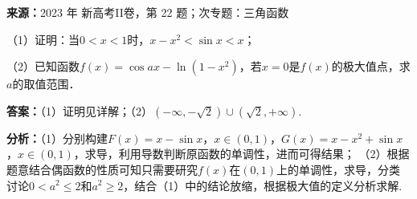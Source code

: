 \begin{question}[points=10]
\textbf{来源：}2023 年 新高考II卷，第 22 题；次专题：三角函数\par
（1）证明：当$0<x<1$时，$x-x^{2}<\sin x<x$；

（2）已知函数$f(x)=\cos ax-\ln(1-x^{2})$，若$x=0$是$f(x)$的极大值点，求$a$的取值范围．
\begin{solution}
\textbf{答案：}（1）证明见详解；（2）$(-\infty,-\sqrt{2})\cup(\sqrt{2},+\infty)$.

\textbf{分析：}（1）分别构建$F(x)=x-\sin x$，$x\in(0,1)$，$G(x)=x-x^{2}+\sin x$，$x\in(0,1)$，求导，利用导数判断原函数的单调性，进而可得结果；
（2）根据题意结合偶函数的性质可知只需要研究$f(x)$在$(0,1)$上的单调性，求导，分类讨论$0<a^{2}\le 2$和$a^{2}\ge 2$，结合（1）中的结论放缩，根据极大值的定义分析求解.


\end{solution}
\end{question}
